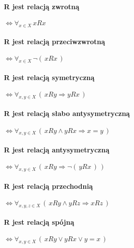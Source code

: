 \documentclass{article}
\begin{document}
    \paragraph{R jest relacją zwrotną} $\Leftrightarrow \forall_{x \in X} \, xRx$
    \paragraph{R jest relacją przeciwzwrotną} $\Leftrightarrow \forall_{x \in X} \, \neg (\,xRx\,)$
    \paragraph{R jest relacją symetryczną} $\Leftrightarrow \forall_{x,y \in X} \, (\,xRy \Longrightarrow yRx\,)$
    \paragraph{R jest relacją słabo antysymetryczną} $\Leftrightarrow \forall_{x,y \in X} \, (\,xRy \wedge yRx \Longrightarrow x = y\,)$
    \paragraph{R jest relacją antysymetryczną} $\Leftrightarrow \forall_{x,y \in X} \, (\,xRy \Longrightarrow \neg(\,yRx\,)\,)$
    \paragraph{R jest relacją przechodnią} $\Leftrightarrow \forall_{x,y,z \in X} \, (\,xRy \wedge yRz \Longrightarrow xRz\,)$
    \paragraph{R jest relacją spójną} $\Leftrightarrow \forall_{x,y \in X} \, (\,xRy \vee yRx \vee y = x\,)$
\end{document}
